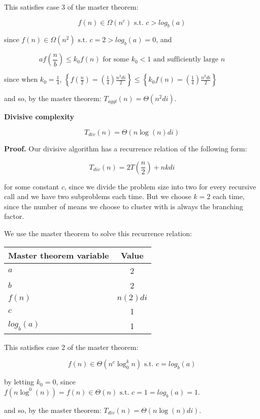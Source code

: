\documentclass[../tech_report_1.tex]{subfiles}
\begin{document}
This satisfies case 3 of the master theorem:

$$ f(n) \in \Omega(n^c) \text{ s.t. } c > log_b(a) $$

since $f(n) \in \Omega(n^2) \text{ s.t. } c = 2 > log_b(a) = 0$, and

$$ af(\frac{n}{b}) \leq k_0 f(n) \text{ for some } k_0 < 1 \text{ and sufficiently large } n$$

since when  $k_0 = \frac{1}{4}$, $\left\{f(\frac{n}{2}) = (\frac{1}{4}) \frac{n^2di}{2}\right\} \leq \left\{k_0f(n) = (\frac{1}{4}) \frac{n^2di}{2}\right\}$

and so, by the master theorem: $ T_{aggl}(n) = \Theta(n^2di)$. \qedsymbol


\begin{theorem} 

\textbf{Divisive complexity}

$$ T_{div}(n) = \Theta(n\log(n)di) $$

\end{theorem}

\textbf{Proof.} Our divisive algorithm has a recurrence relation of the following form:

$$ T_{div}(n) = 2T(\frac{n}{2}) + nkdi $$

for some constant $c$, since we divide the problem size into two for every recursive call and we have two subproblems each time. But we choose $k=2$ each time, since the number of means we choose to cluster with is always the branching factor.

We use the master theorem\cite{thomas2001introduction} to solve this recurrence relation:

\begin{table}[ht]
\centering
\begin{tabular}{l || c }
\hline
\textbf{Master theorem variable} & \textbf{Value} \\
\hline
$a$ & 2 \\
$b$ & 2 \\
$f(n)$ & ${n(2)di}$ \\
$c$ & 1 \\
$log_b(a)$ & 1 \\
\hline
\end{tabular}
\end{table}

This satisfies case 2 of the master theorem:

$$ f(n) \in \Theta(n^c\log^k_0n) \text{ s.t. } c = log_b(a) $$

by letting $k_0=0$, since $f(n\log^0(n)) = f(n) \in \Theta(n) \text{ s.t. } c = 1 = log_b(a) = 1$.

and so, by the master theorem: $ T_{div}(n) = \Theta(n\log(n)di)$. \qedsymbol
\end{document}
